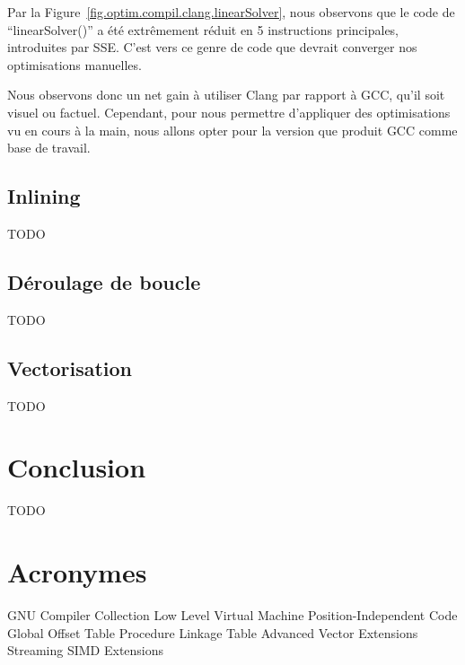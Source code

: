 \documentclass[12pt,a4paper]{article}
\begin{document}
Par la Figure~\ref{fig.optim.compil.clang.linearSolver}, nous observons que le
code de \enquote{linearSolver()} a été extrêmement réduit en 5 instructions
principales, introduites par \ac{SSE}. C’est vers ce genre de code que devrait
converger nos optimisations manuelles.

Nous observons donc un net gain à utiliser Clang par rapport à \ac{GCC}, qu'il
soit visuel ou factuel. Cependant, pour nous permettre d’appliquer des
optimisations vu en cours à la main, nous allons opter pour la version que
produit \ac{GCC} comme base de travail.

\subsection{Inlining}
\label{sub.optim.inlin}

TODO

\subsection{Déroulage de boucle}
\label{sub.optim.unrol}

TODO

\subsection{Vectorisation}
\label{sub.optim.vec}

TODO

\section{Conclusion}
\label{sec.conc}

TODO

\newpage
\section*{Acronymes}
\label{sec.acro}

\begin{acronym}
      {GNU Compiler Collection}
     {Low Level Virtual Machine}
      {Position-Independent Code}
      {Global Offset Table}
      {Procedure Linkage Table}
      {Advanced Vector Extensions}
      {Streaming SIMD Extensions}
\end{acronym}
\end{document}
